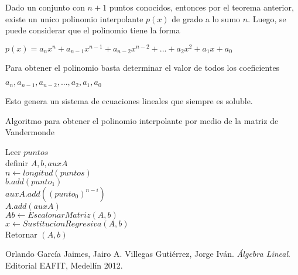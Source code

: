 \documentclass[12pt]{article}
\begin{document}
        Dado un conjunto con $n + 1$ puntos conocidos, entonces por el teorema anterior, existe un unico polinomio interpolante $p(x)$ de grado a lo sumo $n$. Luego, se puede considerar que el polinomio tiene la forma
    
        \begin{center}
            $p(x) = a_nx^n + a_{n-1}x^{n-1} + a_{n-2}x^{n-2} + ... + a_2x^2 + a_1x + a_0$\\
        \end{center}
            
        
        Para obtener el polinomio basta determinar el valor de todos los coeficientes
        \begin{center}
            $a_n, a_{n-1}, a_{n-2}, ..., a_2, a_1, a_0$\\
        \end{center}
        Esto genera un sistema de ecuaciones lineales que siempre es soluble.
        
        \begin{algorithm}[H]
            \caption{Algoritmo para obtener el polinomio interpolante por medio de la matriz de Vandermonde}
            Leer $puntos$\\
            definir $A, b, auxA$\\
            $n \leftarrow longitud(puntos)$\\
            {
                $b.add(punto_{1})$\\
                {
                    $auxA.add((punto_{0})^{n-i})$\\
                }
                $A.add(auxA)$\\
            }
            $Ab \leftarrow EscalonarMatriz(A, b)$\\
            $x \leftarrow SustitucionRegresiva(A, b)$\\
            Retornar $(A, b)$\\
        \end{algorithm}

        

    
        \begin{thebibliography}{9}
            Orlando García Jaimes, Jairo A. Villegas Gutiérrez, Jorge Iván. \textit{Álgebra Lineal}. Editorial EAFIT, Medellín 2012. 
        \end{thebibliography}
    
\end{document}
